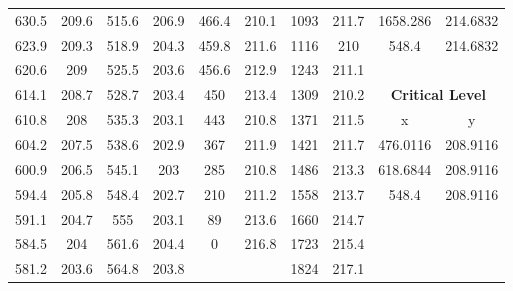 \begin{center}
\begin{tabular}{|cccc||cccc||cc|}
    630.5    & 209.6                   & 515.6 & 206.9                        & 466.4 & 210.1                     & 1093  & 211.7                        & 1658.286 & 214.6832                           \\
    623.9    & 209.3                   & 518.9 & 204.3                        & 459.8 & 211.6                     & 1116  & 210                          & 548.4    & 214.6832                           \\
    620.6    & 209                     & 525.5 & 203.6                        & 456.6 & 212.9                     & 1243  & 211.1                        &          &                                    \\
    614.1    & 208.7                   & 528.7 & 203.4                        & 450   & 213.4                     & 1309  & 210.2                        & \multicolumn{2}{c|}{\textbf{Critical Level}}  \\ 
    \cline{9-10}
    610.8    & 208                     & 535.3 & 203.1                        & 443   & 210.8                     & 1371  & 211.5                        & x        & y                                  \\
    604.2    & 207.5                   & 538.6 & 202.9                        & 367   & 211.9                     & 1421  & 211.7                        & 476.0116 & 208.9116                           \\
    600.9    & 206.5                   & 545.1 & 203                          & 285   & 210.8                     & 1486  & 213.3                        & 618.6844 & 208.9116                           \\
    594.4    & 205.8                   & 548.4 & 202.7                        & 210   & 211.2                     & 1558  & 213.7                        & 548.4    & 208.9116                           \\
    591.1    & 204.7                   & 555   & 203.1                        & 89    & 213.6                     & 1660  & 214.7                        &          &                                    \\
    584.5    & 204                     & 561.6 & 204.4                        & 0     & 216.8                     & 1723  & 215.4                        &          &                                    \\
    581.2    & 203.6                   & 564.8 & 203.8                        &       &                           & 1824  & 217.1                        &          &                                    \\

\end{tabular}
\end{center}
